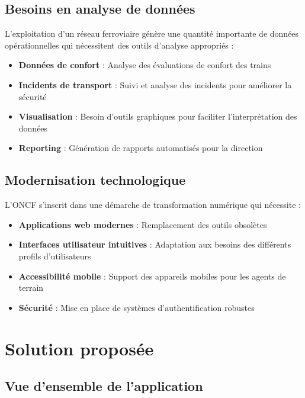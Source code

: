 \subsection{Besoins en analyse de données}

L'exploitation d'un réseau ferroviaire génère une quantité importante de données opérationnelles qui nécessitent des outils d'analyse appropriés :

\begin{itemize}
    \item \textbf{Données de confort} : Analyse des évaluations de confort des trains
    \item \textbf{Incidents de transport} : Suivi et analyse des incidents pour améliorer la sécurité
    \item \textbf{Visualisation} : Besoin d'outils graphiques pour faciliter l'interprétation des données
    \item \textbf{Reporting} : Génération de rapports automatisés pour la direction
\end{itemize}

\subsection{Modernisation technologique}

L'ONCF s'inscrit dans une démarche de transformation numérique qui nécessite :

\begin{itemize}
    \item \textbf{Applications web modernes} : Remplacement des outils obsolètes
    \item \textbf{Interfaces utilisateur intuitives} : Adaptation aux besoins des différents profils d'utilisateurs
    \item \textbf{Accessibilité mobile} : Support des appareils mobiles pour les agents de terrain
    \item \textbf{Sécurité} : Mise en place de systèmes d'authentification robustes
\end{itemize}

\section{Solution proposée}

\subsection{Vue d'ensemble de l'application}

